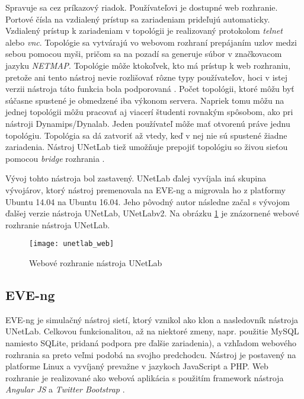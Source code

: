 Spravuje sa cez príkazový riadok. Používateľovi je dostupné web rozhranie. Portové čísla na vzdialený prístup sa zariadeniam prideľujú automaticky. Vzdialený prístup k zariadeniam v topológii je realizovaný protokolom \emph{telnet} alebo \emph{vnc}. Topológie sa vytvárajú vo webovom rozhraní prepájaním uzlov medzi sebou pomocou myši, pričom sa na pozadí sa generuje súbor v značkovacom jazyku \emph{NETMAP}. Topológie môže ktokoľvek, kto má prístup k web rozhraniu, pretože ani tento nástroj nevie rozlišovať rôzne typy používateľov, hoci v istej verzii nástroja táto funkcia bola podporovaná \cite{unetlab_github}. Počet topológii, ktoré môžu byť súčasne spustené je obmedzené iba výkonom servera. Napriek tomu môžu na jednej topológii môžu pracovať aj viacerí študenti rovnakým spôsobom, ako pri nástroji Dynamips/Dynalab. Jeden používateľ môže mať otvorenú práve jednu topológiu. Topológia sa dá zatvoriť až vtedy, keď v nej nie sú spustené žiadne zariadenia. Nástroj UNetLab tiež umožňuje prepojiť topológiu so živou sieťou pomocou \emph{bridge} rozhrania \cite{webiou_real_network}.

Vývoj tohto nástroja bol zastavený. UNetLab ďalej vyvíjala iná skupina vývojárov, ktorý nástroj premenovala na EVE-ng a migrovala ho z platformy Ubuntu 14.04 na Ubuntu 16.04. Jeho pôvodný autor následne začal s vývojom ďalšej verzie nástroja UNetLab, UNetLabv2. Na obrázku \ref{obr:unetlab_web} je znázornené webové rozhranie nástroja UNetLab.

\begin{figure}
    \centering
    \texttt{[image: unetlab\_web]}
    \caption{Webové rozhranie nástroja UNetLab}
    \cite{obr_unetlab_web}
    \label{obr:unetlab_web}
\end{figure}

\subsection{EVE-ng}

EVE-ng je simulačný nástroj sietí, ktorý vznikol ako klon a nasledovník nástroja UNetLab. Celkovou funkcionalitou, až na niektoré zmeny, napr. použitie MySQL namiesto SQLite, pridaná podpora pre ďalšie zariadenia), a vzhľadom webového rozhrania sa preto veľmi podobá na svojho predchodcu. Nástroj je postavený na platforme Linux a vyvíjaný prevažne v jazykoch JavaScript a PHP. Web rozhranie je realizované ako webová aplikácia s použitím framework nástroja \emph{Angular JS} a \emph{Twitter Bootstrap} \cite{eve_ng_technologies}.

